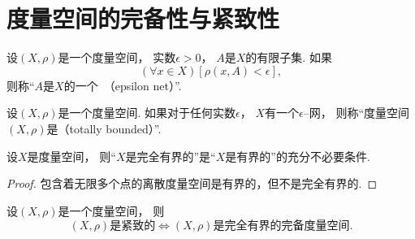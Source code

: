 \section{度量空间的完备性与紧致性}
\begin{definition}
设\((X,\rho)\)是一个度量空间，
实数\(\epsilon>0\)，
\(A\)是\(X\)的有限子集.
如果\[
	(\forall x \in X)
	[\rho(x,A) < \epsilon],
\]
则称“\(A\)是\(X\)的一个~（epsilon net）”.
\end{definition}

\begin{definition}
设\((X,\rho)\)是一个度量空间.
如果对于任何实数\(\epsilon\)，
\(X\)有一个\(\epsilon\)--网，
则称“度量空间\((X,\rho)\)是（totally bounded）”.
\end{definition}

\begin{proposition}
设\(X\)是度量空间，
则“\(X\)是完全有界的”是“\(X\)是有界的”的充分不必要条件.
\begin{proof}
包含着无限多个点的离散度量空间是有界的，但不是完全有界的.
\end{proof}
\end{proposition}

\begin{theorem}
设\((X,\rho)\)是一个度量空间，
则\[
	\text{$(X,\rho)$是紧致的}
	\iff
	\text{$(X,\rho)$是完全有界的完备度量空间}.
\]
\end{theorem}
